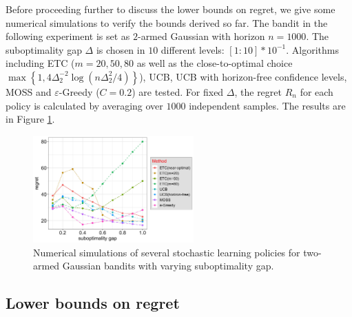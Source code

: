 \documentclass[10pt,a4article]{amsart}
\numberwithin{equation}{section}
\theoremstyle{plain}
\theoremstyle{definition}
\def\e{{\varepsilon}}
\begin{document}
Before proceeding further to discuss the lower bounds on regret, we give some numerical simulations to verify the bounds derived so far. The bandit in the following experiment is set as $2$-armed Gaussian with horizon $n=1000$. The suboptimality gap $\Delta$ is chosen in $10$ different levels: $[1:10]*10^{-1}$.  Algorithms including ETC ($m=20, 50, 80$ as well as the close-to-optimal choice $\max\left\{1, 4\Delta_2^{-2}\log(n\Delta_2^2/4)\right\}$), UCB, UCB with horizon-free confidence levels, MOSS and $\e$-Greedy ($C=0.2$) are tested. For fixed $\Delta$, the regret $R_n$ for each policy is calculated by averaging over $1000$ independent samples. The results are in Figure \ref{fig:1}. 
\begin{figure}[ht]
\centering
\includegraphics[width = 0.55\textwidth,clip,trim = 1cm 0cm 0cm 0cm]{sb}
\caption{Numerical simulations of several stochastic learning policies for two-armed Gaussian bandits with varying suboptimality gap.}
  \label{fig:1}
\end{figure}



\subsection{Lower bounds on regret}
\end{document}
